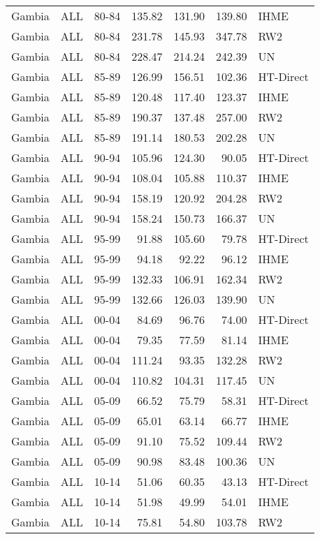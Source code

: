 \begin{longtable}{lllrrrl}
  Gambia & ALL & 80-84 & 135.82 & 131.90 & 139.80 & IHME \\ 
  Gambia & ALL & 80-84 & 231.78 & 145.93 & 347.78 & RW2 \\ 
  Gambia & ALL & 80-84 & 228.47 & 214.24 & 242.39 & UN \\ 
  Gambia & ALL & 85-89 & 126.99 & 156.51 & 102.36 & HT-Direct \\ 
  Gambia & ALL & 85-89 & 120.48 & 117.40 & 123.37 & IHME \\ 
  Gambia & ALL & 85-89 & 190.37 & 137.48 & 257.00 & RW2 \\ 
  Gambia & ALL & 85-89 & 191.14 & 180.53 & 202.28 & UN \\ 
  Gambia & ALL & 90-94 & 105.96 & 124.30 & 90.05 & HT-Direct \\ 
  Gambia & ALL & 90-94 & 108.04 & 105.88 & 110.37 & IHME \\ 
  Gambia & ALL & 90-94 & 158.19 & 120.92 & 204.28 & RW2 \\ 
  Gambia & ALL & 90-94 & 158.24 & 150.73 & 166.37 & UN \\ 
  Gambia & ALL & 95-99 & 91.88 & 105.60 & 79.78 & HT-Direct \\ 
  Gambia & ALL & 95-99 & 94.18 & 92.22 & 96.12 & IHME \\ 
  Gambia & ALL & 95-99 & 132.33 & 106.91 & 162.34 & RW2 \\ 
  Gambia & ALL & 95-99 & 132.66 & 126.03 & 139.90 & UN \\ 
  Gambia & ALL & 00-04 & 84.69 & 96.76 & 74.00 & HT-Direct \\ 
  Gambia & ALL & 00-04 & 79.35 & 77.59 & 81.14 & IHME \\ 
  Gambia & ALL & 00-04 & 111.24 & 93.35 & 132.28 & RW2 \\ 
  Gambia & ALL & 00-04 & 110.82 & 104.31 & 117.45 & UN \\ 
  Gambia & ALL & 05-09 & 66.52 & 75.79 & 58.31 & HT-Direct \\ 
  Gambia & ALL & 05-09 & 65.01 & 63.14 & 66.77 & IHME \\ 
  Gambia & ALL & 05-09 & 91.10 & 75.52 & 109.44 & RW2 \\ 
  Gambia & ALL & 05-09 & 90.98 & 83.48 & 100.36 & UN \\ 
  Gambia & ALL & 10-14 & 51.06 & 60.35 & 43.13 & HT-Direct \\ 
  Gambia & ALL & 10-14 & 51.98 & 49.99 & 54.01 & IHME \\ 
  Gambia & ALL & 10-14 & 75.81 & 54.80 & 103.78 & RW2 \\ 

\end{longtable}
